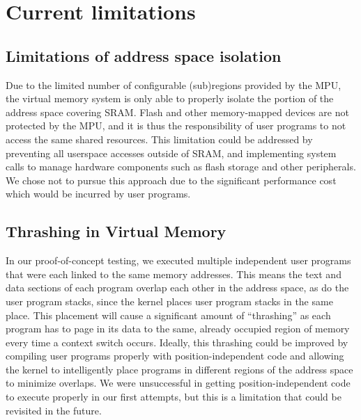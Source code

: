 \documentclass[12pt]{article}
\begin{document}
\section{Current limitations}

\subsection{Limitations of address space isolation}
Due to the limited number of configurable (sub)regions provided by the MPU, the
virtual memory system is only able to properly isolate the portion of the
address space covering SRAM. Flash and other memory-mapped devices are not
protected by the MPU, and it is thus the responsibility of user programs to not
access the same shared resources. This limitation could be addressed by
preventing all userspace accesses outside of SRAM, and implementing system calls
to manage hardware components such as flash storage and other peripherals. We
chose not to pursue this approach due to the significant performance cost which
would be incurred by user programs.

\subsection{Thrashing in Virtual Memory}
In our proof-of-concept testing, we executed multiple independent user programs
that were each linked to the same memory addresses. This means the text and data
sections of each program overlap each other in the address space, as do the
user program stacks, since the kernel places user program stacks in the same 
place. This placement will cause a significant amount of
``thrashing'' as each program has to page in its data to the same, already
occupied region of memory every time a context switch occurs. Ideally, this
thrashing could be improved by compiling user programs properly with
position-independent code and allowing the kernel to intelligently place 
programs in different regions of the address space to minimize overlaps. We
were unsuccessful in getting position-independent code to execute properly in
our first attempts, but this is a limitation that could be revisited in the
future.
\end{document}

